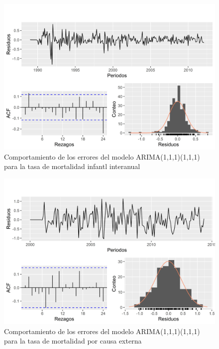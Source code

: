 \documentclass[
]{article}
\begin{document}
\begin{figure}[H]
\includegraphics[width=1\linewidth,height=1\textheight]{Tesis_files/figure-latex/errores_reales_arima_estandar1-1} \caption{Comportamiento de los errores del modelo ARIMA(1,1,1)(1,1,1) para la tasa de mortalidad infantl interanual}\label{fig:errores_reales_arima_estandar1}
\end{figure}

\begin{figure}[H]
\includegraphics[width=1\linewidth,height=1\textheight]{Tesis_files/figure-latex/errores_reales_arima_estandar2-1} \caption{Comportamiento de los errores del modelo ARIMA(1,1,1)(1,1,1) para la tasa de mortalidad por causa externa}\label{fig:errores_reales_arima_estandar2}
\end{figure}
\end{document}
